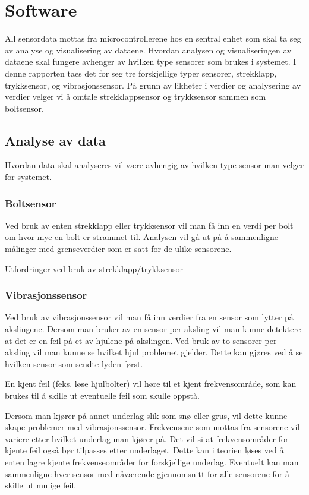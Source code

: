\section{Software}
All sensordata mottas fra microcontrollerene hos en sentral enhet som skal ta seg 
av analyse og visualisering av dataene. Hvordan analysen og visualiseringen av 
dataene skal fungere avhenger av hvilken type sensorer som brukes i systemet. I 
denne rapporten taes det for seg tre forskjellige typer sensorer, strekklapp, 
trykksensor, og vibrasjonssensor. På grunn av likheter i verdier og analysering 
av verdier velger vi å omtale strekklappsensor og trykksensor sammen som 
boltsensor.

\subsection{Analyse av data}
Hvordan data skal analyseres vil være avhengig av hvilken type sensor man velger 
for systemet. 

\subsubsection{Boltsensor}
Ved bruk av enten strekklapp eller trykksensor vil man få inn en verdi per bolt 
om hvor mye en bolt er strammet til. Analysen vil gå ut på å sammenligne målinger 
med grenseverdier som er satt for de ulike sensorene.

Utfordringer ved bruk av strekklapp/trykksensor %

\subsubsection{Vibrasjonssensor}
Ved bruk av vibrasjonssensor vil man få inn verdier fra en sensor som lytter på 
akslingene. Dersom man bruker av en sensor per aksling vil man kunne detektere at 
det er en feil på et av hjulene på akslingen. Ved bruk av to sensorer per aksling 
vil man kunne se hvilket hjul problemet gjelder. Dette kan gjøres ved å se 
hvilken sensor som sendte lyden først.

En kjent feil (feks. løse hjulbolter) vil høre til et kjent frekvensområde, som 
kan brukes til å skille ut eventuelle feil som skulle oppstå.

Dersom man kjører på annet underlag slik som snø eller grus, vil dette kunne 
skape problemer med vibrasjonssensor. Frekvensene som mottas fra sensorene vil 
variere etter hvilket underlag man kjører på. Det vil si at frekvensområder for 
kjente feil også bør tilpasses etter underlaget. Dette kan i teorien løses ved å 
enten lagre kjente frekvenseområder for forskjellige underlag. Eventuelt kan man 
sammenligne hver sensor med nåværende gjennomsnitt for alle sensorene for å 
skille ut mulige feil. 

